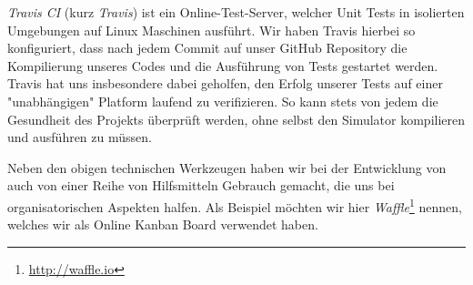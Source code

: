 \begin{sitemize}{-0.6cm}
  \item \emph{Travis CI} (kurz \emph{Travis}) ist ein Online-Test-Server,
  welcher Unit Tests in isolierten Umgebungen auf Linux Maschinen ausführt. Wir
  haben Travis hierbei so konfiguriert, dass nach jedem Commit auf unser GitHub
  Repository die Kompilierung unseres Codes und die Ausführung von Tests
  gestartet werden. Travis hat uns insbesondere dabei geholfen, den Erfolg
  unserer Tests auf einer "unabhängigen" Platform laufend zu verifizieren. So
  kann stets von jedem die Gesundheit des Projekts überprüft werden, ohne selbst
  den Simulator kompilieren und ausführen zu müssen.

\end{sitemize}

Neben den obigen technischen Werkzeugen haben wir bei der Entwicklung von
\erasim{} auch von einer Reihe von Hilfsmitteln Gebrauch gemacht, die uns bei
organisatorischen Aspekten halfen. Als Beispiel möchten wir hier
\emph{Waffle}\footnote{\url{http://waffle.io}} nennen, welches wir als Online
Kanban Board verwendet haben.

